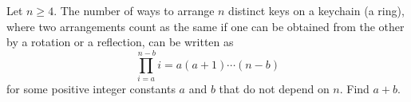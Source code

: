 Let $n\ge4$. The number of ways to arrange $n$ distinct keys on a keychain (a ring), where two arrangements count as the same if one can be obtained from the other by a rotation or a reflection, can be written as
\[\prod_{i=a}^{\,n-b} i=a(a+1)\cdots(n-b)\]
for some positive integer constants $a$ and $b$ that do not depend on $n$. Find $a+b$.
